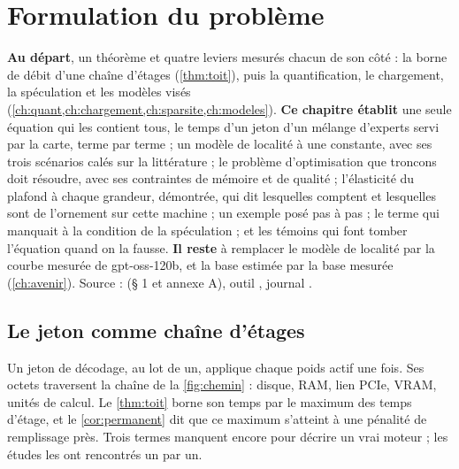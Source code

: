 \chapter{Formulation du problème}\label{ch:formulation}

\begin{origine}
\textbf{Au départ}, un théorème et quatre leviers mesurés chacun de son côté : la borne de débit d'une chaîne d'étages (\cref{thm:toit}), puis la quantification, le chargement, la spéculation et les modèles visés (\cref{ch:quant,ch:chargement,ch:sparsite,ch:modeles}).
\textbf{Ce chapitre établit} une seule équation qui les contient tous, le temps d'un jeton d'un mélange d'experts servi par la carte, terme par terme ; un modèle de localité à une constante, avec ses trois scénarios calés sur la littérature ; le problème d'optimisation que troncons doit résoudre, avec ses contraintes de mémoire et de qualité ; l'élasticité du plafond à chaque grandeur, démontrée, qui dit lesquelles comptent et lesquelles sont de l'ornement sur cette machine ; un exemple posé pas à pas ; le terme qui manquait à la condition de la spéculation ; et les témoins qui font tomber l'équation quand on la fausse.
\textbf{Il reste} à remplacer le modèle de localité par la courbe mesurée de gpt-oss-120b, et la base estimée par la base mesurée (\cref{ch:avenir}).
Source :  (§ 1 et annexe A), outil , journal .
\end{origine}

\section{Le jeton comme chaîne d'étages}\label{sec:jeton-chaine}

Un jeton de décodage, au lot de un, applique chaque poids actif une fois. Ses octets traversent la chaîne de la \cref{fig:chemin} : disque, RAM, lien PCIe, VRAM, unités de calcul. Le \cref{thm:toit} borne son temps par le maximum des temps d'étage, et le \cref{cor:permanent} dit que ce maximum s'atteint à une pénalité de remplissage près. Trois termes manquent encore pour décrire un vrai moteur ; les études les ont rencontrés un par un.

